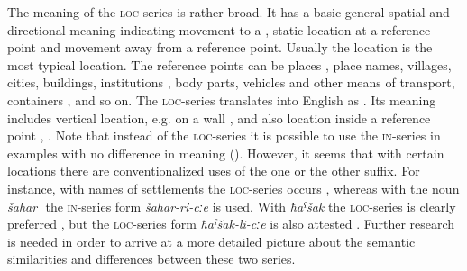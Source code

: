 The meaning of the \textsc{loc}-series is rather broad. It has a basic general spatial and directional meaning indicating movement to a , static location at a reference point and movement away from a reference point. Usually the location is the most typical location. The reference points can be places , place names, villages, cities, buildings, institutions , body parts, vehicles and other means of transport, containers , and so on. The \textsc{loc-}series translates into English as . Its meaning includes vertical location, e.g. on a wall , and also location inside a reference point , . Note that instead of the \textsc{loc}-series it is possible to use the  \textsc{in}-series in examples  with no difference in meaning (). However, it seems that with certain locations there are conventionalized uses of the one or the other suffix. For instance, with names of settlements the \textsc{loc}-series occurs , whereas with the noun \textit{šahar} ‎‎ the \textsc{in}-series form \textit{šahar-ri-cːe} is used. With \textit{ħaˁšak}  the \textsc{loc}-series is clearly preferred , but the \textsc{loc}-series form \textit{ħaˁšak-li-cːe} is also attested . Further research is needed in order to arrive at a more detailed picture about the semantic similarities and differences between these two  series.

